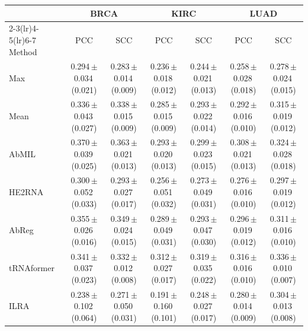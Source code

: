 
\begin{tabular}{lcccccc}
\toprule
& \multicolumn{2}{c}{BRCA} & \multicolumn{2}{c}{KIRC} & \multicolumn{2}{c}{LUAD}\\
\cmidrule(lr){2-3}\cmidrule(lr){4-5}\cmidrule(lr){6-7}
Method & PCC & SCC & PCC & SCC & PCC & SCC\\
\midrule
Max & 0.294\,{\tiny$\pm$}0.034\,{\tiny(0.021)} & 0.283\,{\tiny$\pm$}0.014\,{\tiny(0.009)} & 0.236\,{\tiny$\pm$}0.018\,{\tiny(0.012)} & 0.244\,{\tiny$\pm$}0.021\,{\tiny(0.013)} & 0.258\,{\tiny$\pm$}0.028\,{\tiny(0.018)} & 0.278\,{\tiny$\pm$}0.024\,{\tiny(0.015)}\\
Mean & 0.336\,{\tiny$\pm$}0.043\,{\tiny(0.027)} & 0.338\,{\tiny$\pm$}0.015\,{\tiny(0.009)} & 0.285\,{\tiny$\pm$}0.015\,{\tiny(0.009)} & 0.293\,{\tiny$\pm$}0.022\,{\tiny(0.014)} & 0.292\,{\tiny$\pm$}0.016\,{\tiny(0.010)} & 0.315\,{\tiny$\pm$}0.019\,{\tiny(0.012)}\\
AbMIL & 0.370\,{\tiny$\pm$}0.039\,{\tiny(0.025)} & 0.363\,{\tiny$\pm$}0.021\,{\tiny(0.013)} & 0.293\,{\tiny$\pm$}0.020\,{\tiny(0.013)} & 0.299\,{\tiny$\pm$}0.023\,{\tiny(0.015)} & 0.308\,{\tiny$\pm$}0.021\,{\tiny(0.013)} & 0.324\,{\tiny$\pm$}0.028\,{\tiny(0.018)}\\
HE2RNA & 0.300\,{\tiny$\pm$}0.052\,{\tiny(0.033)} & 0.293\,{\tiny$\pm$}0.027\,{\tiny(0.017)} & 0.256\,{\tiny$\pm$}0.051\,{\tiny(0.032)} & 0.273\,{\tiny$\pm$}0.049\,{\tiny(0.031)} & 0.276\,{\tiny$\pm$}0.016\,{\tiny(0.010)} & 0.297\,{\tiny$\pm$}0.019\,{\tiny(0.012)}\\
AbReg & 0.355\,{\tiny$\pm$}0.026\,{\tiny(0.016)} & 0.349\,{\tiny$\pm$}0.024\,{\tiny(0.015)} & 0.289\,{\tiny$\pm$}0.049\,{\tiny(0.031)} & 0.293\,{\tiny$\pm$}0.047\,{\tiny(0.030)} & 0.296\,{\tiny$\pm$}0.019\,{\tiny(0.012)} & 0.311\,{\tiny$\pm$}0.016\,{\tiny(0.010)}\\
tRNAformer & 0.341\,{\tiny$\pm$}0.037\,{\tiny(0.023)} & 0.332\,{\tiny$\pm$}0.012\,{\tiny(0.008)} & 0.312\,{\tiny$\pm$}0.027\,{\tiny(0.017)} & 0.319\,{\tiny$\pm$}0.035\,{\tiny(0.022)} & 0.316\,{\tiny$\pm$}0.016\,{\tiny(0.010)} & 0.336\,{\tiny$\pm$}0.010\,{\tiny(0.007)}\\
ILRA & 0.238\,{\tiny$\pm$}0.102\,{\tiny(0.064)} & 0.271\,{\tiny$\pm$}0.050\,{\tiny(0.031)} & 0.191\,{\tiny$\pm$}0.160\,{\tiny(0.101)} & 0.248\,{\tiny$\pm$}0.027\,{\tiny(0.017)} & 0.280\,{\tiny$\pm$}0.014\,{\tiny(0.009)} & 0.304\,{\tiny$\pm$}0.013\,{\tiny(0.008)}\\

\end{tabular}
